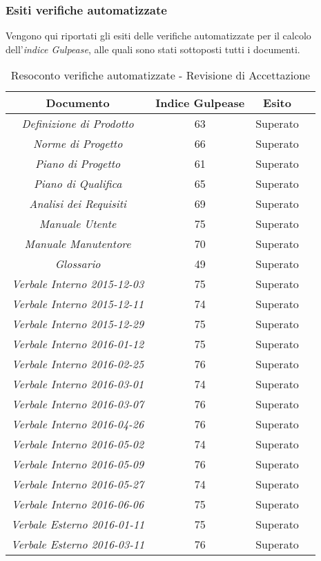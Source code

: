 \subsubsection{Esiti verifiche automatizzate}
Vengono qui riportati gli esiti delle verifiche automatizzate per il calcolo dell'\textit{indice Gulpease}, alle quali sono stati sottoposti tutti i documenti.
\begin{table}[h]
\begin{center}
\begin{tabular}{|c|c|c|c|}
\hline \textbf{Documento} & \textbf{Indice Gulpease} & \textbf{Esito}\\
\hline
\emph{Definizione di Prodotto} & 63 & Superato \\
\emph{Norme di Progetto} & 66 & Superato \\
\emph{Piano di Progetto} & 61 & Superato \\
\emph{Piano di Qualifica} & 65 & Superato \\
\emph{Analisi dei Requisiti} & 69 & Superato \\
\emph{Manuale Utente} & 75 & Superato \\
\emph{Manuale Manutentore} & 70 & Superato \\
\emph{Glossario} & 49 & Superato \\
\emph{Verbale Interno 2015-12-03} & 75 & Superato \\
\emph{Verbale Interno 2015-12-11} & 74 & Superato \\
\emph{Verbale Interno 2015-12-29} & 75 & Superato \\
\emph{Verbale Interno 2016-01-12} & 75 & Superato \\
\emph{Verbale Interno 2016-02-25} & 76 & Superato \\
\emph{Verbale Interno 2016-03-01} & 74 & Superato \\
\emph{Verbale Interno 2016-03-07} & 76 & Superato \\
\emph{Verbale Interno 2016-04-26} & 76 & Superato \\
\emph{Verbale Interno 2016-05-02} & 74 & Superato \\
\emph{Verbale Interno 2016-05-09} & 76 & Superato \\
\emph{Verbale Interno 2016-05-27} & 74 & Superato \\
\emph{Verbale Interno 2016-06-06} & 75 & Superato \\
\emph{Verbale Esterno 2016-01-11} & 75 & Superato \\
\emph{Verbale Esterno 2016-03-11} & 76 & Superato \\
\hline
\end{tabular}
\caption{Resoconto verifiche automatizzate - Revisione di Accettazione}
\end{center}
\end{table}

